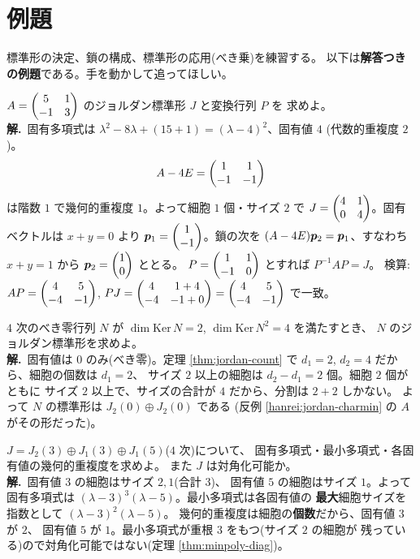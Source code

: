 \section{例題}

標準形の決定、鎖の構成、標準形の応用(べき乗)を練習する。
以下は\textbf{解答つきの例題}である。手を動かして追ってほしい。

\begin{rei}[例題・基本($2$ 次の標準形と $P$)]\label{rei:jordan-basic2}
$A = \begin{pmatrix}5 & 1 \\ -1 & 3\end{pmatrix}$ のジョルダン標準形 $J$ と変換行列 $P$ を
求めよ。\\
\textbf{解.}\ 固有多項式は
$\lambda^2 - 8\lambda + (15 + 1) = (\lambda - 4)^2$、固有値 $4$
(代数的重複度 $2$)。
\[
A - 4E = \begin{pmatrix}1 & 1 \\ -1 & -1\end{pmatrix}
\]
は階数 $1$ で幾何的重複度 $1$。よって細胞 $1$ 個・サイズ $2$ で
$J = \begin{pmatrix}4 & 1 \\ 0 & 4\end{pmatrix}$。固有ベクトルは $x + y = 0$ より
$\bm{p}_1 = \begin{pmatrix}1 \\ -1\end{pmatrix}$。鎖の次を
$(A - 4E)\bm{p}_2 = \bm{p}_1$、すなわち $x + y = 1$ から
$\bm{p}_2 = \begin{pmatrix}1 \\ 0\end{pmatrix}$ ととる。
$P = \begin{pmatrix}1 & 1 \\ -1 & 0\end{pmatrix}$ とすれば $P^{-1}AP = J$。
検算:$AP = \begin{pmatrix}4 & 5 \\ -4 & -1\end{pmatrix}$,
$PJ = \begin{pmatrix}4 & 1 + 4 \\ -4 & -1 + 0\end{pmatrix} = \begin{pmatrix}4 & 5 \\ -4 & -1\end{pmatrix}$ で一致。
\end{rei}

\begin{rei}[例題・基本(核の次元列から細胞を読む)]\label{rei:jordan-read}
$4$ 次のべき零行列 $N$ が
$\dim \mathrm{Ker}\,N = 2$, $\dim \mathrm{Ker}\,N^2 = 4$ を満たすとき、
$N$ のジョルダン標準形を求めよ。\\
\textbf{解.}\ 固有値は $0$ のみ(べき零)。定理 \ref{thm:jordan-count} で
$d_1 = 2$, $d_2 = 4$ だから、細胞の個数は $d_1 = 2$、
サイズ $2$ 以上の細胞は $d_2 - d_1 = 2$ 個。細胞 $2$ 個がともに
サイズ $2$ 以上で、サイズの合計が $4$ だから、分割は $2 + 2$ しかない。
よって $N$ の標準形は $J_2(0) \oplus J_2(0)$ である
(反例 \ref{hanrei:jordan-charmin} の $A$ がその形だった)。
\end{rei}

\begin{rei}[例題・基本(標準形から不変量を読む)]\label{rei:jordan-invread}
$J = J_2(3) \oplus J_1(3) \oplus J_1(5)$($4$ 次)について、
固有多項式・最小多項式・各固有値の幾何的重複度を求めよ。
また $J$ は対角化可能か。\\
\textbf{解.}\ 固有値 $3$ の細胞はサイズ $2, 1$(合計 $3$)、
固有値 $5$ の細胞はサイズ $1$。よって固有多項式は
$(\lambda - 3)^3(\lambda - 5)$。最小多項式は各固有値の
\textbf{最大}細胞サイズを指数として $(\lambda - 3)^2(\lambda - 5)$。
幾何的重複度は細胞の\textbf{個数}だから、固有値 $3$ が $2$、
固有値 $5$ が $1$。最小多項式が重根 $3$ をもつ(サイズ $2$ の細胞が
残っている)ので対角化可能ではない(定理 \ref{thm:minpoly-diag})。
\end{rei}

